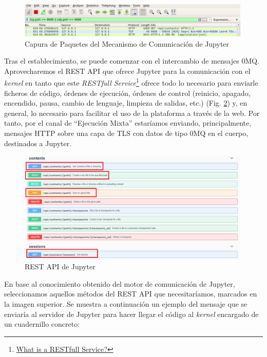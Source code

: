 \begin{figure}[!hbtp]  \centering\noindent
    \includegraphics[width=0.99\textwidth]{figures/wireshark.png}
    \caption{Capura de Paquetes del Mecanismo de Comunicación de Jupyter}
    \label{wireshark}
\end{figure}

Tras el establecimiento, se puede comenzar con el intercambio de mensajes 0MQ. Aprovecharemos el REST API que ofrece Jupyter para la comunicación con el \textit{kernel} en tanto que este \textit{RESTfull Service}\footnote{\href{https://docs.oracle.com/javaee/6/tutorial/doc/gijqy.html}{What is a RESTfull Service?}} ofrece todo lo necesario para enviarle ficheros de código, órdenes de ejecución, órdenes de control (reinicio, apagado, encendido, pausa, cambio de lenguaje, limpieza de salidas, etc.) (Fig. \ref{jupyter_rest_api}) y, en general, lo necesario para facilitar el uso de la plataforma a través de la web. Por tanto, por el canal de ``Ejecución Mixta'' estaríamos enviando, principalmente, mensajes HTTP sobre una capa de TLS con datos de tipo 0MQ en el cuerpo, destinados a Jupyter.

\begin{figure}[!hbtp]  \centering\noindent
    \includegraphics[width=0.99\textwidth]{figures/jupyter_rest_api.png}
    \caption{REST API de Jupyter}
    \label{jupyter_rest_api}
\end{figure}

En base al conocimiento obtenido del motor de comunicación de Jupyter, seleccionamos aquellos métodos del REST API que necesitaríamos, marcados en la imagen superior. Se muestra a continuación un ejemplo del mensaje que se enviaría al servidor de Jupyter para hacer llegar el código al \textit{kernel} encargado de un cuadernillo concreto:


